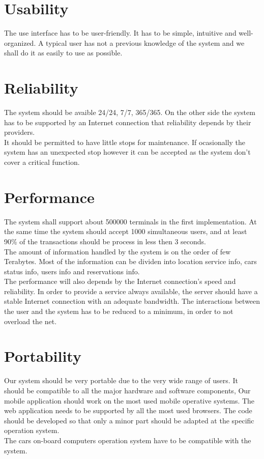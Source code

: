 \section{Usability}
\label{sec:usability}
 The use interface has to be user-friendly. It has to be simple, intuitive and well-organized. A typical user has not a previous knowledge of the system and we shall do it as easily to use as possible.

\section{Reliability}
The system should be avaible 24/24, 7/7, 365/365. On the other side the system has to be supported by an Internet connection that reliability depends by their providers.  
\\It should be permitted to have little stops for maintenance. If ocasionally the system has an unexpected stop however it can be accepted as the system don't cover a critical function. 

\section{Performance}
The system shall support about 500000 terminals in the first implementation. At the same time the system should accept 1000 simultaneous users, and at least 90\% of the transactions should be process in less then 3 seconds.
\\The amount of information handled by the system is on the order of few Terabytes. Most of the information can be dividen into location service info, cars status info, users info and reservations info.
\\The performance will also depends by the Internet connection’s speed and reliability. In order to provide a service always available, the server should have a stable Internet connection with an adequate bandwidth.
The interactions between the user and the system has to be reduced to a minimum, in order to not overload the net. 

\section{Portability}
Our system should be very portable due to the very wide range of users. It should be compatible to all the major hardware and software components, Our mobile application should work on the most used mobile operative systems. The web application needs to be supported by all the most used browsers. The code should be developed so that only a minor part should be adapted at the specific operation system.
\\The cars on-board computers operation system have to be compatible with the system. %


